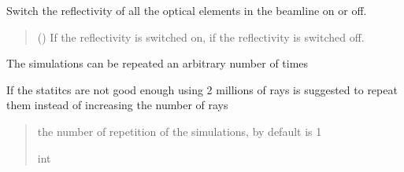 \documentclass[letterpaper,10pt,english]{sphinxmanual}
\begin{document}
\begin{fulllineitems}
\begin{fulllineitems}
\label{\detokenize{API:raypyng.simulate.Simulate.reflectivity}}
\pysigstartsignatures
\pysiglinewithargsret
{}
{}
{}
\pysigstopsignatures
\sphinxAtStartPar
Switch the reflectivity of all the optical elements in the beamline on or off.
\begin{quote}\begin{description}
\sphinxAtStartPar
{} (\sphinxstyleliteralemphasis{\sphinxupquote{, }}) \textendash{} If  the reflectivity is switched on,
if  the reflectivity is switched off.

\end{description}\end{quote}

\end{fulllineitems}


\begin{fulllineitems}
\label{\detokenize{API:raypyng.simulate.Simulate.repeat}}
\pysigstartsignatures
\pysigline
{}
\pysigstopsignatures
\sphinxAtStartPar
The simulations can be repeated an arbitrary number of times

\sphinxAtStartPar
If the statitcs are not good enough using 2 millions of rays is suggested
to repeat them instead of increasing the number of rays
\begin{quote}\begin{description}
\sphinxAtStartPar
the number of repetition of the simulations, by default is 1

\sphinxAtStartPar
int

\end{description}\end{quote}

\end{fulllineitems}



\end{fulllineitems}
\end{document}
